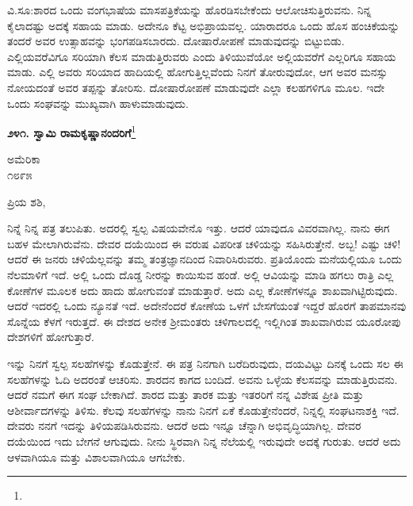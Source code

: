 ವಿ.ಸೂ:\enginline{-}ಶಾರದ ಒಂದು ವಂಗಭಾಷೆಯ ಮಾಸಪತ್ರಿಕೆಯನ್ನು ಹೊರಡಿಸಬೇಕೆಂದು ಆಲೋಚಿಸುತ್ತಿರುವನು. ನಿನ್ನ ಕೈಲಾದಷ್ಟು ಅದಕ್ಕೆ ಸಹಾಯ ಮಾಡು. ಅದೇನೂ ಕೆಟ್ಟ ಅಭಿಪ್ರಾಯವಲ್ಲ. ಯಾರಾದರೂ ಒಂದು ಹೊಸ ಹಂಚಿಕೆಯನ್ನು ತಂದರೆ ಅವರ ಉತ್ಸಾಹವನ್ನು ಭಂಗಪಡಿಸಬಾರದು. ದೋಷಾರೋಪಣೆ ಮಾಡುವುದನ್ನು ಬಿಟ್ಟುಬಿಡು. ಎಲ್ಲಿಯವರೆವಿಗೂ ಸರಿಯಾಗಿ ಕೆಲಸ ಮಾಡುತ್ತಿರುವರು ಎಂದು ತಿಳಿಯುವೆಯೋ ಅಲ್ಲಿಯವರೆಗೆ ಎಲ್ಲರಿಗೂ ಸಹಾಯ ಮಾಡು. ಎಲ್ಲಿ ಅವರು ಸರಿಯಾದ ಹಾದಿಯಲ್ಲಿ ಹೋಗುತ್ತಿಲ್ಲವೆಂದು ನಿನಗೆ ತೋರುವುದೋ, ಆಗ ಅವರ ಮನಸ್ಸು ನೋಯದಂತೆ ಅವರ ತಪ್ಪನ್ನು ತೋರಿಸು. ದೋಷಾರೋಪಣೆ ಮಾಡುವುದೇ ಎಲ್ಲಾ ಕಲಹಗಳಿಗೂ ಮೂಲ. ಇದೇ ಒಂದು ಸಂಘವನ್ನು ಮುಖ್ಯವಾಗಿ ಹಾಳುಮಾಡುವುದು.

\begin{center}
\textbf{೨೪೧. ಸ್ವಾಮಿ ರಾಮಕೃಷ್ಣಾನಂದರಿಗೆ}\footnote{}
\end{center}

\vspace{-0.5cm}

\begin{flushright}
ಅಮೆರಿಕಾ\\೧೮೯೫
\end{flushright}

\vspace{-0.3cm}

\noindent
ಪ್ರಿಯ ಶಶಿ,

ನಿನ್ನೆ ನಿನ್ನ ಪತ್ರ ತಲುಪಿತು. ಅದರಲ್ಲಿ ಸ್ವಲ್ಪ ವಿಷಯವೇನೊ ಇತ್ತು. ಆದರೆ ಯಾವುದೂ ವಿವರವಾಗಿಲ್ಲ. ನಾನು ಈಗ ಬಹಳ ಮೇಲಾಗಿರುವೆನು. ದೇವರ ದಯೆಯಿಂದ ಈ ವರುಷ ವಿಪರೀತ ಚಳಿಯನ್ನು ಸಹಿಸಿರುತ್ತೇನೆ. ಅಬ್ಬ! ಎಷ್ಟು ಚಳಿ! ಆದರೆ ಈ ಜನರು ಚಳಿಯೆಲ್ಲವನ್ನು ತಮ್ಮ ತಂತ್ರಜ್ಞಾನದಿಂದ ನಿವಾರಿಸಿರುವರು. ಪ್ರತಿಯೊಂದು ಮನೆಯಲ್ಲಿಯೂ ಒಂದು ನೆಲಮಾಳಿಗೆ ಇದೆ. ಅಲ್ಲಿ ಒಂದು ದೊಡ್ಡ ನೀರನ್ನು ಕಾಯಿಸುವ ಹಂಡೆ. ಅಲ್ಲಿ ಆವಿಯನ್ನು ಮಾಡಿ ಹಗಲು ರಾತ್ರಿ ಎಲ್ಲ ಕೋಣೆಗಳ ಮೂಲಕ ಅದು ಹಾದು ಹೋಗುವಂತೆ ಮಾಡುತ್ತಾರೆ. ಅದು ಎಲ್ಲ ಕೋಣೆಗಳನ್ನೂ ಶಾಖವಾಗಿಟ್ಟಿರುವುದು. ಆದರೆ ಇದರಲ್ಲಿ ಒಂದು ನ್ಯೂನತೆ ಇದೆ. ಅದೇನೆಂದರೆ ಕೋಣೆಯ ಒಳಗೆ ಬೇಸಗೆಯಂತೆ ಇದ್ದರೆ ಹೊರಗೆ ತಾಪಮಾನವು ಸೊನ್ನೆಯ ಕೆಳಗೆ ಇರುತ್ತದೆ. ಈ ದೇಶದ ಅನೇಕ ಶ‍್ರೀಮಂತರು ಚಳಿಗಾಲದಲ್ಲಿ ಇಲ್ಲಿಗಿಂತ ಶಾಖವಾಗಿರುವ ಯೂರೋಪು ದೇಶಗಳಿಗೆ ಹೋಗುತ್ತಾರೆ.

ಇನ್ನು ನಿನಗೆ ಸ್ವಲ್ಪ ಸಲಹೆಗಳನ್ನು ಕೊಡುತ್ತೇನೆ. ಈ ಪತ್ರ ನಿನಗಾಗಿ ಬರೆದಿರುವುದು, ದಯವಿಟ್ಟು ದಿನಕ್ಕೆ ಒಂದು ಸಲ ಈ ಸಲಹೆಗಳನ್ನು ಓದಿ ಅದರಂತೆ ಆಚರಿಸು. ಶಾರದನ ಕಾಗದ ಬಂದಿದೆ. ಅವನು ಒಳ್ಳೆಯ ಕೆಲಸವನ್ನು ಮಾಡುತ್ತಿರುವನು. ಆದರೆ ನಮಗೆ ಈಗ ಸಂಘ ಬೇಕಾಗಿದೆ. ಶಾರದ ಮತ್ತು ತಾರಕ ಮತ್ತು ಇತರರಿಗೆ ನನ್ನ ವಿಶೇಷ ಪ್ರೀತಿ ಮತ್ತು ಆಶೀರ್ವಾದಗಳನ್ನು ತಿಳಿಸು. ಕೆಲವು ಸಲಹೆಗಳನ್ನು ನಾನು ನಿನಗೆ ಏಕೆ ಕೊಡುತ್ತೇನೆಂದರೆ, ನಿನ್ನಲ್ಲಿ ಸಂಘಟನಾಶಕ್ತಿ ಇದೆ. ದೇವರು ನನಗೆ ಇದನ್ನು ತಿಳಿಯಪಡಿಸಿರುವನು. ಆದರೆ ಅದು ಇನ್ನೂ ಚೆನ್ನಾಗಿ ಅಭಿವೃದ್ಧಿಯಾಗಿಲ್ಲ. ದೇವರ ದಯೆಯಿಂದ ಇದು ಬೇಗನೆ ಆಗುವುದು. ನೀನು ಸ್ಥಿರವಾಗಿ ನಿನ್ನ ನೆಲೆಯಲ್ಲಿ ಇರುವುದೇ ಅದಕ್ಕೆ ಗುರುತು. ಆದರೆ ಅದು ಆಳವಾಗಿಯೂ ಮತ್ತು ವಿಶಾಲವಾಗಿಯೂ ಆಗಬೇಕು.

\vspace{0.1cm}

